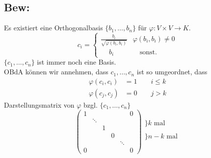 \documentclass[titlepage,12pt,a4paper,ngerman]{report}
\newcommand{\tx}[1]{\textrm{#1}}
\newcommand{\casess}[4]{\left\{ \begin{array}{ll} {#1} & {#2} \\ {#3} & {#4} \end{array} \right.}
\begin{document}
\subsection{Bew:}
Es existiert eine Orthogonalbasis  $ \{b_1,\dots , b_n\} $ für $ \varphi:V \times V \to K $.
$$c_i = \casess{\frac{b_i}{\sqrt{\varphi(b_i,b_i)}}}{\varphi(b_i,b_i) \neq 0}{\quad \ b_i}{\quad \tx{sonst.}}$$
$ \{c_1,\dots , c_n \} $ ist immer noch eine Basis.\\
OBdA können wir annehmen, dass $ c_1,\dots,c_n $ ist so umgeordnet, dass
\begin{align*}
\varphi(c_i,c_i) &= 1  \qquad i \le k\\
\varphi(c_j,c_j) &= 0  \qquad j > k
\end{align*}
Darstellungsmatrix von $ \varphi $ bzgl. $ \{c_1,\dots , c_n\} $
$$ \begin{pmatrix}
1 & & & & & 0\\
& \ddots\\
& & 1\\
& & & 0\\
& & & & \ddots\\
0 & & & & & 0
\end{pmatrix} \begin{array}{l}
\\
\Bigg\} k \tx{ mal}\\
\\
\bigg\} n-k \tx{ mal}\\
\\
\end{array}$$
\end{document}
